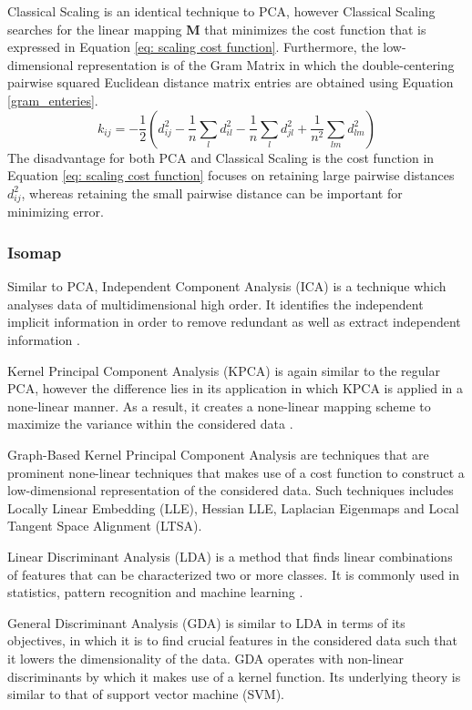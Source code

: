 \documentclass[11pt,twocolumn]{witseiepaper}
\begin{document}
	Classical Scaling is an identical technique to PCA, however Classical Scaling searches for the linear mapping \textbf{M} that minimizes the cost function that is expressed in Equation \ref{eq: scaling cost function}. Furthermore, the low-dimensional representation is of the Gram Matrix in which the double-centering pairwise squared Euclidean distance matrix entries are obtained using Equation \ref{gram_enteries}.
	\begin{equation}
		k_{ij} = -\frac{1}{2}(d_{ij}^{2}-\frac{1}{n}\sum_{l}d_{il}^{2} - \frac{1}{n}\sum_{l}d_{jl}^{2} + \frac{1}{n^2}\sum_{lm}d_{lm}^{2})
		\label{gram_enteries}
	\end{equation}
	The disadvantage for both PCA and Classical Scaling is the cost function in Equation \ref{eq: scaling cost function} focuses on retaining large pairwise distances $d_{ij}^2$, whereas retaining the small pairwise distance can be important for minimizing error.
	
	\subsubsection{Isomap}
	
	Similar to PCA, Independent Component Analysis (ICA) is a technique which analyses data of multidimensional high order. It identifies the independent implicit information in order to remove redundant as well as extract independent information \cite{7852869}.
	
	Kernel Principal Component Analysis (KPCA) is again similar to the regular PCA, however the difference lies in its application in which KPCA is applied in a none-linear manner. As a result, it creates a none-linear mapping scheme to maximize the variance within the considered data \cite{KPCA_2016}.
	
	Graph-Based Kernel Principal Component Analysis are techniques that are prominent none-linear techniques that makes use of a cost function to construct a low-dimensional representation of the considered data. Such techniques includes Locally Linear Embedding (LLE), Hessian LLE, Laplacian Eigenmaps and Local Tangent Space Alignment (LTSA). 
	
	Linear Discriminant Analysis (LDA)  is a method that finds linear combinations of features that can be characterized two or more classes. It is commonly used in statistics, pattern recognition and machine learning \cite{LDA_2016}.
	
	General Discriminant Analysis (GDA) is similar to LDA in terms of its objectives, in which it is to find crucial features in the considered data such that it lowers the dimensionality of the data. GDA operates with non-linear discriminants by which it makes use of a kernel function. Its underlying theory is similar to that of support vector machine (SVM).
	
\end{document}
